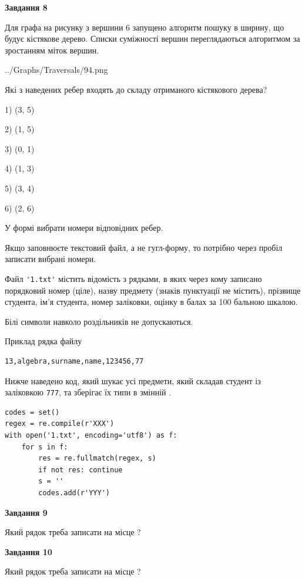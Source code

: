\documentclass[12pt, ukrainian]{article}
\def\code#1{\Verb!#1!}
\begin{document}
{\begin {large}
{\begin {center}\textbf{Завдання 8}\end {center}}\par
Для графа на рисунку з вершини 6 запущено алгоритм пошуку в ширину, що будує кістякове дерево. Списки суміжності вершин переглядаються алгоритмом за зростанням міток вершин.\par
\begin{center}
	{../Graphs/Traversals/94.png}
\end{center}
\par Які з наведених ребер входять до складу отриманого кістякового дерева?\par
1) (3, 5)\par
2) (1, 5)\par
3) (0, 1)\par
4) (1, 3)\par
5) (3, 4)\par
6) (2, 6)\par
{\vskip 15pt} У формі вибрати номери відповідних ребер.


Якщо заповнюєте текстовий файл, а не гугл-форму, то потрібно через пробіл записа\-ти вибрані номери.\par
\newpage


Файл \code{'1.txt'} містить відомість з рядками, в яких через кому записано поряд\-ковий номер (ціле), назву предмету (знаків пунктуації не містить), прізвище студента, ім'я студента, номер заліковки, оцінку в балах за 100 бальною шкалою.

Білі символи навколо роздільників не допускаються.

Приклад рядка файлу



\begin{verbatim}
13,algebra,surname,name,123456,77
\end{verbatim}


Нижче наведено код, який шукає усі предмети, який складав студент із заліковкою \code{777}, та зберігає їх типи в змінній .



\begin{verbatim}
codes = set()
regex = re.compile(r'XXX')
with open('1.txt', encoding='utf8') as f:
    for s in f:
        res = re.fullmatch(regex, s)
        if not res: continue
        s = ''
        codes.add(r'YYY')
\end{verbatim}


{\begin {center}\textbf{Завдання 9}\end {center}}\par
Який рядок треба записати на місце  ?\par
\vspace{5mm}


{\begin {center}\textbf{Завдання 10}\end {center}}\par
Який рядок треба записати на місце  ?\par


\newpage


\end {large}}
\end{document}
